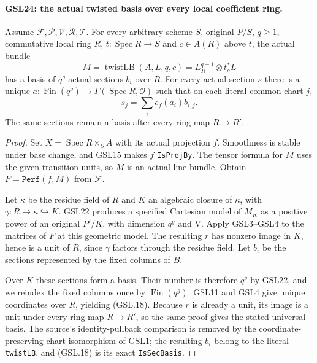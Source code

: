 \paragraph{GSL24: the actual twisted basis over every local coefficient ring.}
\label{claim:GSL24}
Assume $\mathcal F,\mathcal P,\mathcal V,\mathcal R,\mathcal T$.
For every arbitrary scheme $S$, original $P/S$, $q\ge1$,
commutative local ring $R$, $t:\operatorname{Spec}R\to S$
and $c\in A(R)$ above $t$, the actual bundle
\[
 M=\operatorname{twistLB}(A,L,q,c)
     =L_R^{q-1}\otimes t_c^*L
\]
has a basis of $q^g$ actual sections $b_i$ over $R$.
For every actual section $s$ there is a unique
$a:\operatorname{Fin}(q^g)\to\Gamma(\operatorname{Spec}R,\mathcal O)$
such that on each literal common chart $j$,
\[
 s_j=\sum_i c_f(a_i)b_{i,j}. \tag{GSL.18}
\]
The same sections remain a basis after every ring map $R\to R'$.

\begin{proof}
Set $X=\operatorname{Spec}R\times_S A$ with its actual projection
$f$.  Smoothness is stable under base change, and GSL15 makes
$f$ \texttt{IsProjBy}.  The tensor formula for $M$ uses the
given transition units, so $M$ is an actual line bundle.
Obtain $F=\texttt{Perf}(f,M)$ from $\mathcal F$.

Let $\kappa$ be the residue field of $R$ and $K$ an algebraic
closure of $\kappa$, with $\gamma:R\to\kappa\hookrightarrow K$.
GSL22 produces a specified Cartesian model of $M_K$ as a
positive power of an original $P'/K$, with dimension $q^g$
and $\mathrm V$.  Apply GSL3--GSL4 to the matrices of $F$
at this geometric model.  The resulting $r$ has nonzero
image in $K$, hence is a unit of $R$, since $\gamma$ factors
through the residue field.  Let $b_i$ be the sections
represented by the fixed columns of $B$.

Over $K$ these sections form a basis.  Their number is
therefore $q^g$ by GSL22, and we reindex the fixed columns
once by $\operatorname{Fin}(q^g)$.  GSL11 and GSL4 give
unique coordinates over $R$, yielding (GSL.18).
Because $r$ is already a unit, its image is a unit under
every ring map $R\to R'$, so the same proof gives the stated
universal basis.  The source's identity-pullback comparison
is removed by the coordinate-preserving chart isomorphism
of GSL1; the resulting $b_i$ belong to the literal
\texttt{twistLB}, and (GSL.18) is its exact \texttt{IsSecBasis}.
\end{proof}

